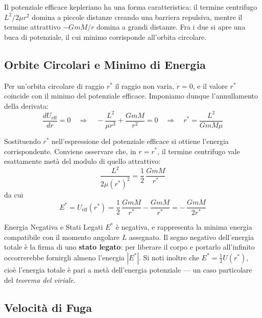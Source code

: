 Il potenziale efficace kepleriano ha una forma caratteristica: il termine centrifugo $L^2/2\mu r^2$ domina a piccole distanze creando una barriera repulsiva, mentre il termine attrattivo $-GmM/r$ domina a grandi distanze. Fra i due si apre una buca di potenziale, il cui minimo corrisponde all'orbita circolare.

\subsection{Orbite Circolari e Minimo di Energia}

Per un'orbita circolare di raggio $r^*$ il raggio non varia, $\dot{r} = 0$, e il valore $r^*$ coincide con il minimo del potenziale efficace. Imponiamo dunque l'annullamento della derivata:
\begin{equation}
    \frac{dU_{\text{eff}}}{dr} = 0
    \quad \Longrightarrow \quad
    - \frac{L^2}{\mu r^3} + \frac{GmM}{r^2} = 0
    \quad \Longrightarrow \quad
    r^* = \frac{L^2}{G m M \mu}
\end{equation}

Sostituendo $r^*$ nell'espressione del potenziale efficace si ottiene l'energia corrispondente. Conviene osservare che, in $r = r^*$, il termine centrifugo vale esattamente metà del modulo di quello attrattivo:
\begin{equation}
    \frac{L^2}{2\mu (r^*)^2} = \frac{1}{2}\,\frac{GmM}{r^*}
\end{equation}
da cui
\begin{equation}
    E^* = U_{\text{eff}}(r^*)
        = \frac{1}{2}\,\frac{GmM}{r^*} - \frac{GmM}{r^*}
        = - \, \frac{GmM}{2 r^*}
\end{equation}

\begin{osservazione}{Energia Negativa e Stati Legati}
$E^*$ è negativa, e rappresenta la minima energia compatibile con il momento angolare $L$ assegnato. Il segno negativo dell'energia totale è la firma di uno \textbf{stato legato}: per liberare il corpo e portarlo all'infinito occorrerebbe fornirgli almeno l'energia $|E^*|$. Si noti inoltre che $E^* = \frac{1}{2}U(r^*)$, cioè l'energia totale è pari a metà dell'energia potenziale --- un caso particolare del \emph{teorema del viriale}.
\end{osservazione}

\subsection{Velocità di Fuga}


